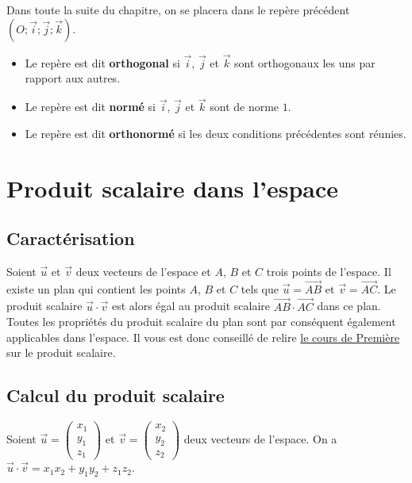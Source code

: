 	Dans toute la suite du chapitre, on se placera dans le repère précédent $(O ; \overrightarrow{i} ; \overrightarrow{j} ; \overrightarrow{k})$.
	
	
	\begin{formula}
		\begin{itemize}
			\item Le repère est dit \textbf{orthogonal} si $\overrightarrow{i}$, $\overrightarrow{j}$ et $\overrightarrow{k}$ sont orthogonaux les uns par rapport aux autres.
			\item Le repère est dit \textbf{normé} si $\overrightarrow{i}$, $\overrightarrow{j}$ et $\overrightarrow{k}$ sont de norme $1$.
			\item Le repère est dit \textbf{orthonormé} si les deux conditions précédentes sont réunies.
		\end{itemize}
	\end{formula}
	
	\section{Produit scalaire dans l'espace}
	
	\subsection{Caractérisation}
	
	Soient $\overrightarrow{u}$ et $\overrightarrow{v}$ deux vecteurs de l'espace et $A$, $B$ et $C$ trois points de l'espace. Il existe un plan qui contient les points $A$, $B$ et $C$ tels que $\overrightarrow{u} = \overrightarrow{AB}$ et $\overrightarrow{v} = \overrightarrow{AC}$. Le produit scalaire $\overrightarrow{u} \cdot \overrightarrow{v}$ est alors égal au produit scalaire $\overrightarrow{AB} \cdot \overrightarrow{AC}$ dans ce plan.
	\newpar
	Toutes les propriétés du produit scalaire du plan sont par conséquent également applicables dans l'espace. Il vous est donc conseillé de relire \href{https://bacomathiqu.es/cours/premiere/geometrie-reperee/le-produit-scalaire}{le cours de Première} sur le produit scalaire.
	
	\subsection{Calcul du produit scalaire}
	
	\begin{formula}
		Soient $\overrightarrow{u} = \begin{pmatrix} {x_1} \\ {y_1} \\ {z_1} \end{pmatrix}$ et $\overrightarrow{v} = \begin{pmatrix} {x_2} \\ {y_2} \\ {z_2} \end{pmatrix}$ deux vecteurs de l'espace.
		\newpar
		On a $\overrightarrow{u} \cdot \overrightarrow{v} = x_1x_2 + y_1y_2 + z_1z_2$.
	\end{formula}
	
